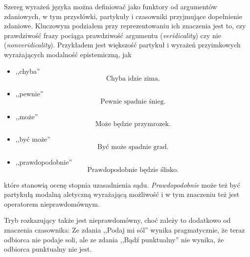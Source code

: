 \documentclass[12pt]{mwart}
\theoremstyle{remark}
\begin{document}
Szereg wyrażeń języka można definiować jako funktory od argumentów zdaniowych, w tym przysłówki, partykuły i czasowniki przyjmujące dopełnienie zdaniowe. Kluczowym podziałem przy reprezentowaniu ich znaczenia jest to, czy prawdziwość frazy pociąga prawdziwość argumentu (\emph{veridicality}) czy nie (\emph{nonveridicality}).
Przykładem jest większość partykuł i wyrażeń przyimkowych wyrażających modalność epistemiczną, jak
\begin{itemize}
\item ,,chyba''
\begin{equation}
	\text{Chyba idzie zima.}
\end{equation}
\item ,,pewnie''
\begin{equation}
	\text{Pewnie spadnie śnieg.}
\end{equation}
\item ,,może''
\begin{equation}
	\text{Może będzie przymrozek.}
\end{equation}
\item ,,być może''
\begin{equation}
	\text{Być może spadnie grad.}
\end{equation}
\item ,,prawdopodobnie''
\begin{equation}
	\text{Prawdopodobnie będzie ślisko.}
\end{equation}
\end{itemize}
które stanowią ocenę stopnia uzasadnienia sądu. \emph{Prawdopodobnie} może też być partykułą modalną aletyczną wyrażającą możliwość i w tym znaczeniu też jest operatorem nieprawdomównym.

Tryb rozkazujący także jest nieprawdomówny, choć zależy to dodatkowo od znaczenia czasownika: Ze zdania ,,Podaj mi sól'' wynika pragmatycznie, że teraz odbiorca nie podaje soli, ale ze zdania ,,Bądź punktualny'' nie wynika, że odbiorca punktualny nie jest.
\end{document}

